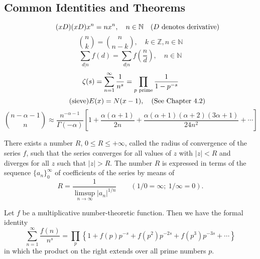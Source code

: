\subsection*{Common Identities and Theorems}
\begin{equation} \label{eq:xD} \tag{$xD$}
    (xD) x^n = nx^n, \quad  n \in \mathbb{N} \quad (D \textnormal{ denotes derivative})
\end{equation}
\begin{equation} \label{eq:bin_sym}
    \binom{n}{k} = \binom{n}{n-k}, \quad  k\in\mathbb{Z}, n \in\mathbb{N} 
\end{equation}
\begin{equation} \label{eq:div_swap}
    \sum_{d\vert n} f(d) = \sum_{d\vert n} f\left(\frac{n}{d}\right), \quad  n \in\mathbb{N}
\end{equation}
\begin{equation} \label{eq:power_zeta}
    \zeta(s) = \sum_{n=1}^\infty \frac{1}{n^s} = \prod_{\textnormal{$p$ prime}} \frac{1}{1-p^{-s}}
\end{equation}
\begin{equation} \label{eq:sieve} \tag{sieve}
    E(x) = N(x-1), \quad (\textnormal{See Chapter 4.2})
\end{equation}
\begin{equation} \label{eq:binom_asymp}
    \binom{n-\alpha-1}{n} \approx \frac{n^{-\alpha-1}}{\Gamma(-\alpha)} \left[1 + \frac{\alpha(\alpha +1)}{2n} + \frac{\alpha(\alpha+1)(\alpha+2)(3\alpha+1)}{24n^2} + \cdots\right]
\end{equation}
\begin{theorem} \label{thm:conv_power}
    There exists a number $R$, $0\leq R \leq +\infty$, called the radius of convergence of the series $f$, such that the series converges for all values of $z$ with $|z|<R$ and diverges for all $z$ such that $|z|>R$. The number $R$ is expressed in terms of the sequence $\{a_n\}_0^\infty$ of coefficients of the series by means of
    \[
        R = \frac{1}{\limsup_{n\to\infty} |a_n|^{1/n}} \qquad (1/0=\infty;\ 1/\infty = 0).
    \]
\end{theorem}
\begin{theorem} \label{thm:euler_prod}
    Let $f$ be a multiplicative number-theoretic function. Then we have the formal identity
    \[
        \sum_{n=1}^\infty \frac{f(n)}{n^s} = \prod_p \left\{1+f(p)p^{-s} + f(p^2)p^{-2s} + f(p^3)p^{-3s} + \cdots\right\}
    \]
    in which the product on the right extends over all prime numbers $p$.
\end{theorem}
